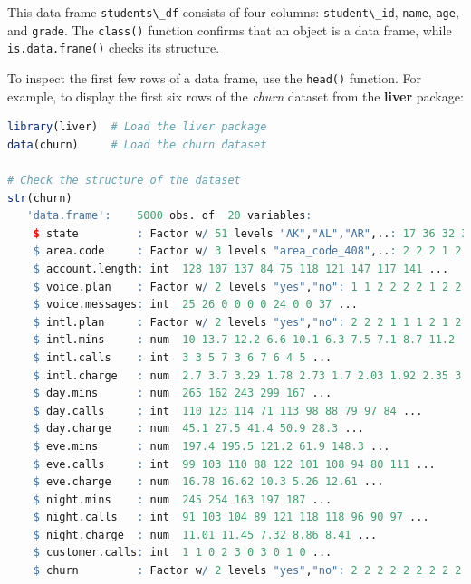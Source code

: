 \documentclass[
]{book}
\newcommand{\passthrough}[1]{#1}
\theoremstyle{definition}
\theoremstyle{definition}
\theoremstyle{definition}
\theoremstyle{definition}
\theoremstyle{remark}
\begin{document}
This data frame \passthrough{\lstinline!students\_df!} consists of four columns: \passthrough{\lstinline!student\_id!}, \passthrough{\lstinline!name!}, \passthrough{\lstinline!age!}, and \passthrough{\lstinline!grade!}. The \passthrough{\lstinline!class()!} function confirms that an object is a data frame, while \passthrough{\lstinline!is.data.frame()!} checks its structure.

To inspect the first few rows of a data frame, use the \passthrough{\lstinline!head()!} function. For example, to display the first six rows of the \emph{churn} dataset from the \textbf{liver} package:

\begin{lstlisting}[language=R]
library(liver)  # Load the liver package
data(churn)     # Load the churn dataset

# Check the structure of the dataset
str(churn)
   'data.frame':    5000 obs. of  20 variables:
    $ state         : Factor w/ 51 levels "AK","AL","AR",..: 17 36 32 36 37 2 20 25 19 50 ...
    $ area.code     : Factor w/ 3 levels "area_code_408",..: 2 2 2 1 2 3 3 2 1 2 ...
    $ account.length: int  128 107 137 84 75 118 121 147 117 141 ...
    $ voice.plan    : Factor w/ 2 levels "yes","no": 1 1 2 2 2 2 1 2 2 1 ...
    $ voice.messages: int  25 26 0 0 0 0 24 0 0 37 ...
    $ intl.plan     : Factor w/ 2 levels "yes","no": 2 2 2 1 1 1 2 1 2 1 ...
    $ intl.mins     : num  10 13.7 12.2 6.6 10.1 6.3 7.5 7.1 8.7 11.2 ...
    $ intl.calls    : int  3 3 5 7 3 6 7 6 4 5 ...
    $ intl.charge   : num  2.7 3.7 3.29 1.78 2.73 1.7 2.03 1.92 2.35 3.02 ...
    $ day.mins      : num  265 162 243 299 167 ...
    $ day.calls     : int  110 123 114 71 113 98 88 79 97 84 ...
    $ day.charge    : num  45.1 27.5 41.4 50.9 28.3 ...
    $ eve.mins      : num  197.4 195.5 121.2 61.9 148.3 ...
    $ eve.calls     : int  99 103 110 88 122 101 108 94 80 111 ...
    $ eve.charge    : num  16.78 16.62 10.3 5.26 12.61 ...
    $ night.mins    : num  245 254 163 197 187 ...
    $ night.calls   : int  91 103 104 89 121 118 118 96 90 97 ...
    $ night.charge  : num  11.01 11.45 7.32 8.86 8.41 ...
    $ customer.calls: int  1 1 0 2 3 0 3 0 1 0 ...
    $ churn         : Factor w/ 2 levels "yes","no": 2 2 2 2 2 2 2 2 2 2 ...


\end{lstlisting}
\end{document}
